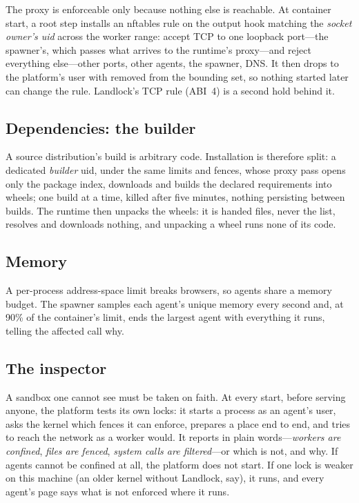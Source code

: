 The proxy is enforceable only because nothing else is reachable. At
container start, a root step installs an nftables rule on the output
hook matching the \emph{socket owner's uid} across the worker range:
accept TCP to one loopback port---the spawner's, which passes what
arrives to the runtime's proxy---and reject everything
else---other ports, other agents, the spawner, DNS. It then drops to
the platform's user with  removed from the bounding
set, so nothing started later can change the rule. Landlock's TCP rule
(ABI~4) is a second hold behind it.

\subsection{Dependencies: the builder}

A source distribution's build is arbitrary code. Installation is
therefore split: a dedicated \emph{builder} uid, under the same limits
and fences, whose proxy pass opens only the package index, downloads
and builds the declared requirements into wheels; one build at a time,
killed after five minutes, nothing persisting between builds. The
runtime then unpacks the wheels: it is handed files, never the list,
resolves and downloads nothing, and unpacking a wheel runs none of its
code.

\subsection{Memory}

A per-process address-space limit breaks browsers, so agents share a
memory budget. The spawner samples each agent's unique memory every
second and, at 90\% of the container's limit, ends the largest agent
with everything it runs, telling the affected call why.

\subsection{The inspector}

A sandbox one cannot see must be taken on faith. At every start,
before serving anyone, the platform tests its own locks: it starts a
process as an agent's user, asks the kernel which fences it can
enforce, prepares a place end to end, and tries to reach the network as
a worker would. It reports in plain words---\emph{workers are confined},
\emph{files are fenced}, \emph{system calls are filtered}---or which is
not, and why. If agents cannot be confined at all, the platform does not
start. If one lock is weaker on this machine (an older kernel without
Landlock, say), it runs, and every agent's page says what is not
enforced where it runs.
